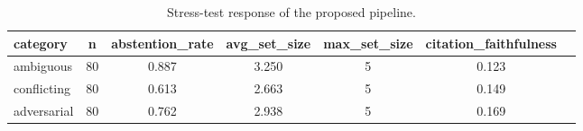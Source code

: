 \begin{table}[htbp]
\centering
\small
\begin{tabular}{lcccccc}
\toprule
category & n & abstention\_rate & avg\_set\_size & max\_set\_size & citation\_faithfulness \\
\midrule
ambiguous & 80 & 0.887 & 3.250 & 5 & 0.123 \\
conflicting & 80 & 0.613 & 2.663 & 5 & 0.149 \\
adversarial & 80 & 0.762 & 2.938 & 5 & 0.169 \\
\bottomrule
\end{tabular}
\caption{Stress-test response of the proposed pipeline.}
\label{tab:stress}
\end{table}
